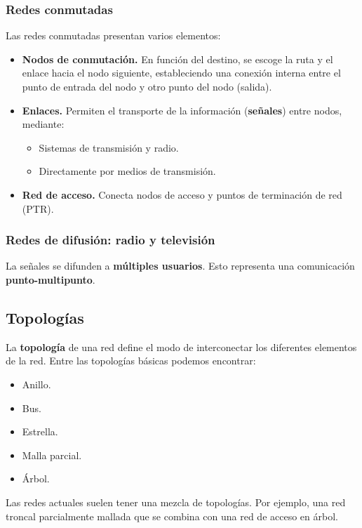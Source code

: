 \documentclass[a4paper]{book}
\numberwithin{figure}{chapter}
\numberwithin{equation}{subsection}
\begin{document}
\subsubsection{Redes conmutadas}
Las redes conmutadas presentan varios elementos:
\begin{itemize}
  \item \textbf{Nodos de conmutación.} En función del destino, se escoge la ruta y el enlace hacia el nodo siguiente, estableciendo una conexión interna entre el punto de entrada del nodo y otro punto del nodo (salida).
  \item \textbf{Enlaces.} Permiten el transporte de la información (\textbf{señales}) entre nodos, mediante:
        \begin{itemize}
          \item Sistemas de transmisión y radio.
          \item Directamente por medios de transmisión.
        \end{itemize}
  \item \textbf{Red de acceso.} Conecta nodos de acceso y puntos de terminación de red (PTR).
\end{itemize}

\subsubsection{Redes de difusión: radio y televisión}
La señales se difunden a \textbf{múltiples usuarios}. Esto representa una comunicación \textbf{punto-multipunto}.

\subsection{Topologías}
La \textbf{topología} de una red define el modo de interconectar los diferentes elementos de la red. Entre las topologías básicas podemos encontrar:
\begin{multicols}{3}
  \begin{itemize}
    \item Anillo.
    \item Bus.
    \item Estrella.
    \item Malla parcial.
    \item Árbol.
  \end{itemize}
\end{multicols}

Las redes actuales suelen tener una mezcla de topologías. Por ejemplo, una red troncal parcialmente mallada que se combina con una red de acceso en árbol.
\end{document}
